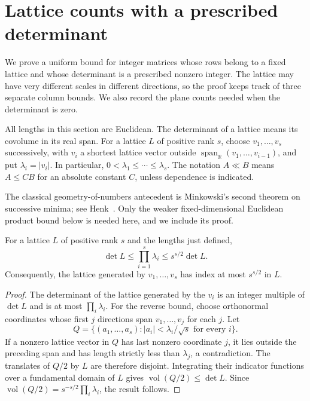 \section{Lattice counts with a prescribed determinant}
\label{lat:section}

We prove a uniform bound for integer matrices whose rows belong to a fixed
lattice and whose determinant is a prescribed nonzero integer.  The lattice
may have very different scales in different directions, so the proof keeps
track of three separate column bounds.  We also record the plane counts
needed when the determinant is zero.

All lengths in this section are Euclidean.  The determinant of a lattice
means its covolume in its real span.  For a lattice $L$ of positive rank $s$, choose
$v_1,\ldots,v_s$ successively, with $v_i$ a shortest lattice vector outside
$\operatorname{span}_{\mathbb R}(v_1,\ldots,v_{i-1})$, and put
$\lambda_i=|v_i|$.  In particular,
$0<\lambda_1\le\cdots\le\lambda_s$.  The notation $A\ll B$ means
$A\le CB$ for an absolute constant $C$, unless dependence is indicated.

The classical geometry-of-numbers antecedent is Minkowski's second
theorem on successive minima; see Henk~\cite[Theorem 1.3]{Henk2002}.
Only the weaker fixed-dimensional Euclidean product bound below is
needed here, and we include its proof.

\begin{lemma}\label{lat:successive}
For a lattice $L$ of positive rank $s$ and the lengths just defined,
\[
 \det L\le\prod_{i=1}^s\lambda_i\le s^{s/2}\det L.
\]
Consequently, the lattice generated by $v_1,\ldots,v_s$ has index at most
$s^{s/2}$ in $L$.
\end{lemma}

\begin{proof}
The determinant of the lattice generated by the $v_i$ is an integer
multiple of $\det L$ and is at most $\prod_i\lambda_i$.
For the reverse bound, choose orthonormal coordinates whose first $j$
directions span $v_1,\ldots,v_j$ for each $j$.  Let
\[
 Q=\{(a_1,\ldots,a_s): |a_i|<\lambda_i/\sqrt{s}\text{ for every }i\}.
\]
If a nonzero lattice vector in $Q$ has last nonzero coordinate $j$, it
lies outside the preceding span and has length strictly less than
$\lambda_j$, a contradiction.  The translates of $Q/2$ by $L$ are
therefore disjoint.  Integrating their indicator functions over a
fundamental domain of $L$ gives
$\operatorname{vol}(Q/2)\le\det L$.
Since $\operatorname{vol}(Q/2)=s^{-s/2}\prod_i\lambda_i$, the result follows.
\end{proof}

